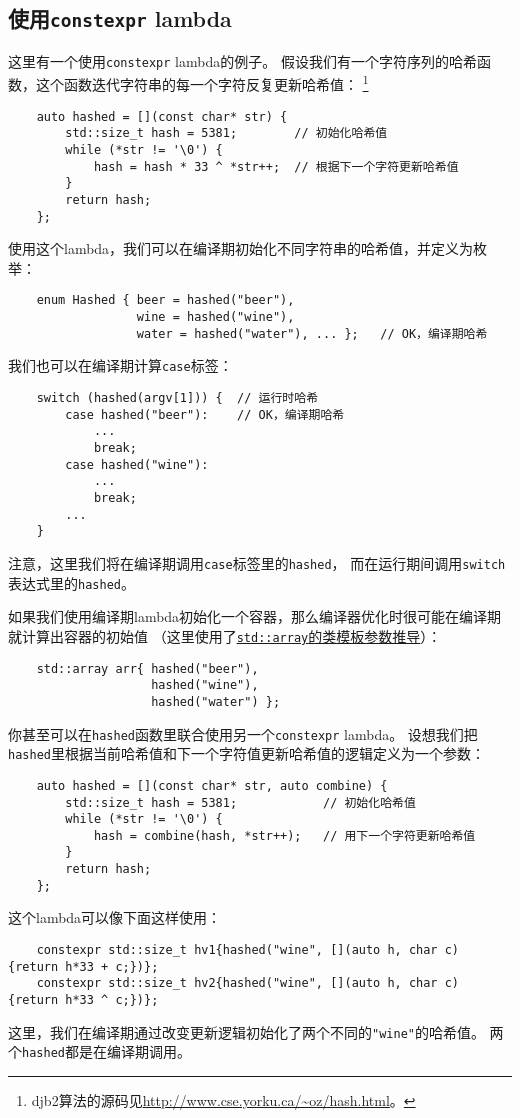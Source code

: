 \subsection{使用\texttt{constexpr} lambda}
这里有一个使用\texttt{constexpr} lambda的例子。
假设我们有一个字符序列的哈希函数，这个函数迭代字符串的每一个字符反复更新哈希值：
\footnote{djb2算法的源码见\url{http://www.cse.yorku.ca/~oz/hash.html}。}
\begin{lstlisting}
    auto hashed = [](const char* str) {
        std::size_t hash = 5381;        // 初始化哈希值
        while (*str != '\0') {
            hash = hash * 33 ^ *str++;  // 根据下一个字符更新哈希值
        }
        return hash;
    };
\end{lstlisting}
使用这个lambda，我们可以在编译期初始化不同字符串的哈希值，并定义为枚举：
\begin{lstlisting}
    enum Hashed { beer = hashed("beer"),
                  wine = hashed("wine"),
                  water = hashed("water"), ... };   // OK，编译期哈希
\end{lstlisting}
我们也可以在编译期计算\texttt{case}标签：
\begin{lstlisting}
    switch (hashed(argv[1])) {  // 运行时哈希
        case hashed("beer"):    // OK，编译期哈希
            ...
            break;
        case hashed("wine"):
            ...
            break;
        ...
    }
\end{lstlisting}
注意，这里我们将在编译期调用\texttt{case}标签里的\texttt{hashed}，
而在运行期间调用\texttt{switch}表达式里的\texttt{hashed}。

如果我们使用编译期lambda初始化一个容器，那么编译器优化时很可能在编译期就计算出容器的初始值
（这里使用了\hyperref[ch9.2.6.3]{\texttt{std::array}的类模板参数推导}）：
\begin{lstlisting}
    std::array arr{ hashed("beer"),
                    hashed("wine"),
                    hashed("water") };
\end{lstlisting}
你甚至可以在\texttt{hashed}函数里联合使用另一个\texttt{constexpr} lambda。
设想我们把\texttt{hashed}里根据当前哈希值和下一个字符值更新哈希值的逻辑定义为一个参数：
\begin{lstlisting}
    auto hashed = [](const char* str, auto combine) {
        std::size_t hash = 5381;            // 初始化哈希值
        while (*str != '\0') {
            hash = combine(hash, *str++);   // 用下一个字符更新哈希值
        }
        return hash;
    };
\end{lstlisting}
这个lambda可以像下面这样使用：
\begin{lstlisting}
    constexpr std::size_t hv1{hashed("wine", [](auto h, char c) {return h*33 + c;})};
    constexpr std::size_t hv2{hashed("wine", [](auto h, char c) {return h*33 ^ c;})};
\end{lstlisting}
这里，我们在编译期通过改变更新逻辑初始化了两个不同的\texttt{"wine"}的哈希值。
两个\texttt{hashed}都是在编译期调用。


